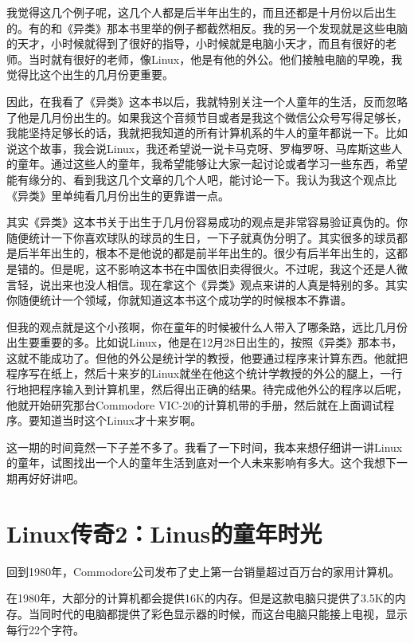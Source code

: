 \documentclass[
  letterpaper,
  DIV=11,
  numbers=noendperiod]{scrreprt}
\begin{document}
我觉得这几个例子呢，这几个人都是后半年出生的，而且还都是十月份以后出生的。有的和《异类》那本书里举的例子都截然相反。我的另一个发现就是这些电脑的天才，小时候就得到了很好的指导，小时候就是电脑小天才，而且有很好的老师。当时就有很好的老师，像Linux，他是有他的外公。他们接触电脑的早晚，我觉得比这个出生的几月份更重要。

因此，在我看了《异类》这本书以后，我就特别关注一个人童年的生活，反而忽略了他是几月份出生的。如果我这个音频节目或者是我这个微信公众号写得足够长，我能坚持足够长的话，我就把我知道的所有计算机系的牛人的童年都说一下。比如说这个故事，我会说Linux，我还希望说一说卡马克呀、罗梅罗呀、马库斯这些人的童年。通过这些人的童年，我希望能够让大家一起讨论或者学习一些东西，希望能有缘分的、看到我这几个文章的几个人吧，能讨论一下。我认为我这个观点比《异类》里单纯看几月份出生的更靠谱一点。

其实《异类》这本书关于出生于几月份容易成功的观点是非常容易验证真伪的。你随便统计一下你喜欢球队的球员的生日，一下子就真伪分明了。其实很多的球员都是后半年出生的，根本不是他说的都是前半年出生的。很少有后半年出生的，这都是错的。但是呢，这不影响这本书在中国依旧卖得很火。不过呢，我这个还是人微言轻，说出来也没人相信。现在拿这个《异类》观点来讲的人真是特别的多。其实你随便统计一个领域，你就知道这本书这个成功学的时候根本不靠谱。

但我的观点就是这个小孩啊，你在童年的时候被什么人带入了哪条路，远比几月份出生要重要的多。比如说Linux，他是在12月28日出生的，按照《异类》那本书，这就不能成功了。但他的外公是统计学的教授，他要通过程序来计算东西。他就把程序写在纸上，然后十来岁的Linux就坐在他这个统计学教授的外公的腿上，一行行地把程序输入到计算机里，然后得出正确的结果。待完成他外公的程序以后呢，他就开始研究那台Commodore
VIC-20的计算机带的手册，然后就在上面调试程序。要知道当时这个Linux才十来岁啊。

这一期的时间竟然一下子差不多了。我看了一下时间，我本来想仔细讲一讲Linux的童年，试图找出一个人的童年生活到底对一个人未来影响有多大。这个我想下一期再好好讲吧。


\chapter{Linux传奇2：Linus的童年时光}\label{linuxux4f20ux59472linusux7684ux7ae5ux5e74ux65f6ux5149}

回到1980年，Commodore公司发布了史上第一台销量超过百万台的家用计算机。

在1980年，大部分的计算机都会提供16K的内存。但是这款电脑只提供了3.5K的内存。当同时代的电脑都提供了彩色显示器的时候，而这台电脑只能接上电视，显示每行22个字符。
\end{document}

